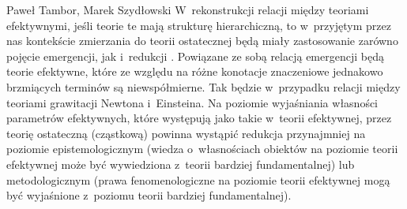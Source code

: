 \begin{artplenv2auth}{Paweł Tambor, Marek Szydłowski}
W~rekonstrukcji relacji między teoriami efektywnymi, jeśli teorie te mają strukturę hierarchiczną, to w~przyjętym przez nas kontekście zmierzania do teorii ostatecznej będą miały zastosowanie zarówno pojęcie emergencji, jak i~redukcji
\parencites[][]{butterfield_reduction_2014}[][]{castellani_reductionism_2002}[][]{bain_emergence_2013}. %
 Powiązane ze sobą relacją emergencji będą teorie efektywne, które ze względu na różne konotacje znaczeniowe jednakowo brzmiących terminów są niewspółmierne. Tak będzie w~przypadku relacji między teoriami grawitacji Newtona i~Einsteina. Na poziomie wyjaśniania własności parametrów efektywnych, które występują jako takie w~teorii efektywnej, przez teorię ostateczną (cząstkową) powinna wystąpić redukcja przynajmniej na poziomie epistemologicznym (wiedza o~własnościach obiektów na poziomie teorii efektywnej może być wywiedziona z~teorii bardziej fundamentalnej) lub metodologicznym (prawa fenomenologiczne na poziomie teorii efektywnej mogą być wyjaśnione z~poziomu teorii bardziej fundamentalnej).


\end{artplenv2auth}
